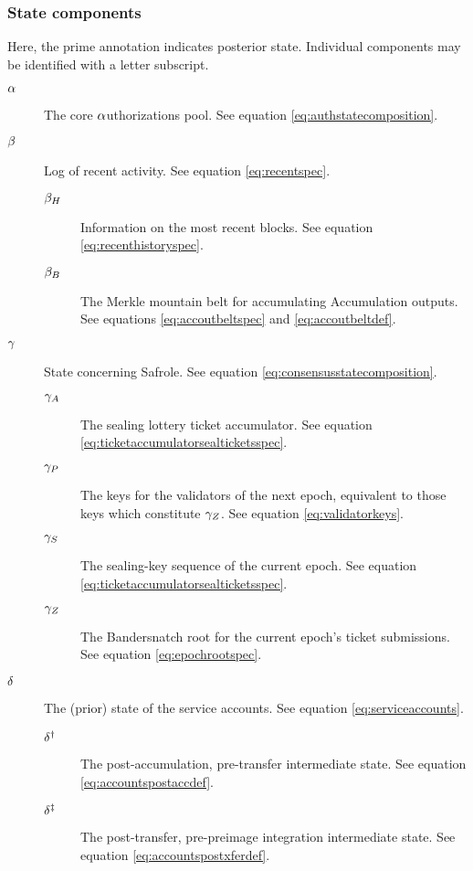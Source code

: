 \subsubsection{State components}

Here, the prime annotation indicates posterior state. Individual components may be identified with a letter subscript.
\begin{description}
  \item[$\alpha$] The core $\alpha$uthorizations pool. See equation \ref{eq:authstatecomposition}.
  \item[$\beta$] Log of recent activity. See equation \ref{eq:recentspec}.
  \begin{description}
    \item[$\beta_H$] Information on the most recent blocks. See equation \ref{eq:recenthistoryspec}.
    \item[$\beta_B$] The Merkle mountain belt for accumulating Accumulation outputs. See equations \ref{eq:accoutbeltspec} and \ref{eq:accoutbeltdef}.
  \end{description}
  \item[$\gamma$] State concerning Safrole. See equation \ref{eq:consensusstatecomposition}.
  \begin{description}
    \item[$\gamma_A$] The sealing lottery ticket accumulator. See equation \ref{eq:ticketaccumulatorsealticketsspec}.
    \item[$\gamma_P$] The keys for the validators of the next epoch, equivalent to those keys which constitute $\gamma_Z$. See equation \ref{eq:validatorkeys}.
    \item[$\gamma_S$] The sealing-key sequence of the current epoch. See equation \ref{eq:ticketaccumulatorsealticketsspec}.
    \item[$\gamma_Z$] The Bandersnatch root for the current epoch's ticket submissions. See equation \ref{eq:epochrootspec}.
  \end{description}
  \item[$\delta$] The (prior) state of the service accounts. See equation \ref{eq:serviceaccounts}.
  \begin{description}
    \item[$\delta^\dagger$] The post-accumulation, pre-transfer intermediate state. See equation \ref{eq:accountspostaccdef}.
    \item[$\delta^\ddagger$] The post-transfer, pre-preimage integration intermediate state. See equation \ref{eq:accountspostxferdef}.

\end{description}
\end{description}
